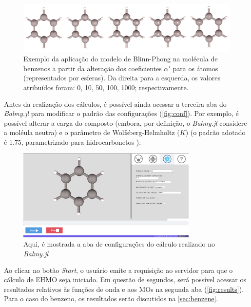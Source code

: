 \begin{figure}[htb]
\caption{\label{fig:representations} Exemplo da aplicação do modelo de Blinn-Phong na molécula de benzenos a partir da alteração dos coeficientes $\alpha'$ para os átomos (representados por esferas). Da direita para a esquerda, os valores atribuídos foram: 0, 10, 50, 100, 1000; respectivamente.}
	\begin{center}
		\includegraphics[width=1.0\textwidth]{images/shininess(1).png}
	\end{center}
\end{figure}

Antes da realização dos cálculos, é possível ainda acessar a terceira aba do \textit{Balmy.jl} para modificar o padrão das configurações (\autoref{fig:conf}). Por exemplo, é possível alterar a carga do composto (embora, por definição, o \textit{Balmy.jl} considere a moléula neutra) e o parâmetro de Wolfsberg-Helmholtz ($K$) (o padrão adotado é 1.75, parametrizado para hidrocarbonetos \autocite{Hoffmann1963}).

\begin{figure}[htb]
	\caption{\label{fig:conf} Aqui, é mostrada a aba de configurações do cálculo realizado no \textit{Balmy.jl}}
	\begin{center}
		\includegraphics[width=0.8\textwidth]{images/conf.png}
	\end{center}
\end{figure}


Ao clicar no botão \textit{Start}, o usuário emite a requisição ao servidor para que o cálculo de \gls{EHMO} seja iniciado. Em questão de segundos, será possível acessar os resultados relativos ãs funções de onda e aos \gls{MOs} na segunda aba (\autoref{fig:results}). Para o caso do benzeno, os resultados serão discutidos na \autoref{sec:benzene}.

